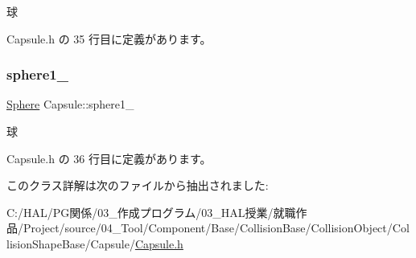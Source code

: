 球 



 Capsule.\+h の 35 行目に定義があります。

\mbox{\label{class_capsule_ac478efc95993a85908a7cd2759133ab2}} 
\subsubsection{\texorpdfstring{sphere1\+\_\+}{sphere1\_}}
{\footnotesize\ttfamily \mbox{\hyperlink{class_sphere}{Sphere}} Capsule\+::sphere1\+\_\+\hspace{0.3cm}{\ttfamily [private]}}



球 



 Capsule.\+h の 36 行目に定義があります。



このクラス詳解は次のファイルから抽出されました\+:\begin{DoxyCompactItemize}
\item 
C\+:/\+H\+A\+L/\+P\+G関係/03\+\_\+作成プログラム/03\+\_\+\+H\+A\+L授業/就職作品/\+Project/source/04\+\_\+\+Tool/\+Component/\+Base/\+Collision\+Base/\+Collision\+Object/\+Collision\+Shape\+Base/\+Capsule/\mbox{\hyperlink{_capsule_8h}{Capsule.\+h}}\end{DoxyCompactItemize}
